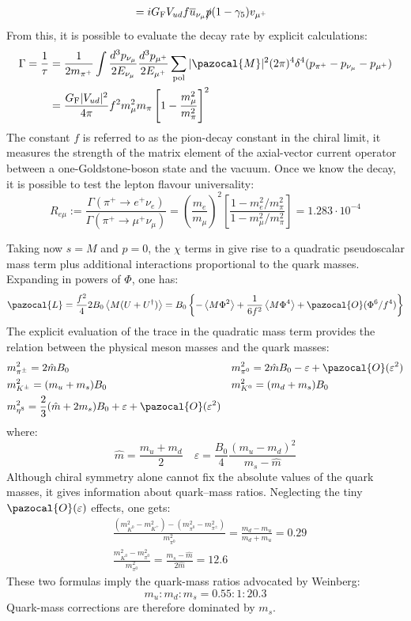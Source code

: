 \documentclass[../main.tex]{subfiles}
\begin{document}
\begin{kaobox}[frametitle=Charged Pion Decay]
\begin{align*}
&=iG_{\text{F}}V_{ud}f\overline{u}_{\nu_\mu}\slashed{p}(1-\gamma_5)v_{\mu^+}
\end{align*}
From this, it is possible to evaluate the decay rate by explicit calculations:
\begin{align*}
\Gamma=\frac{1}{\tau}&=\frac{1}{2m_{\pi^+}}\int\frac{d^3p_{\nu_\mu}}{2E_{\nu_\mu}}\frac{d^3p_{\mu^+}}{2E_{\mu^+}}\sum_{\text{pol}}|\pazocal{M}|^2(2\pi)^4\delta^4(p_{\pi^+}-p_{\nu_\mu}-p_{\mu^+})\\
&=\frac{G_{\text{F}}|V_{ud}|^2}{4\pi}f^2m_\mu^2m_\pi\left[1-\frac{m_\mu^2}{m_\pi^2}\right]^2
\end{align*}
The constant $f$ is referred to as the pion-decay constant in the chiral limit, it measures the strength of the matrix element of the axial-vector current
operator between a one-Goldstone-boson state and the vacuum. Once we know the decay, it is possible to test the lepton flavour universality:
\[
R_{e\mu}:=\frac{\Gamma(\pi^+\to e^+\nu_e)}{\Gamma(\pi^+\to\mu^+\nu_\mu)}=\left(\frac{m_e}{m_\mu}\right)^2\left[\frac{1-m_e^2/m_\pi^2}{1-m_\mu^2/m_\pi^2}\right]=1.283\cdot10^{-4}
\]
\end{kaobox}
Taking now $s=M$ and $p=0$, the $\chi$ terms in  give rise to a
quadratic pseudoscalar mass term plus additional interactions proportional to the quark masses. Expanding in powers of $\Phi$, one has:
\[
\pazocal{L}=\frac{f^2}{4}2B_0\Braket{M(U+U^\dagger)}=B_0\left\{-\Braket{M\Phi^2}+\frac{1}{6f^2}\Braket{M\Phi^4}+\pazocal{O}(\Phi^6/f^4)\right\}
\]
The explicit evaluation of the trace in the quadratic mass term provides the relation between the physical meson masses and the quark masses:
\[
\begin{aligned}
&m_{\pi^\pm}^2=2\hat{m}B_0 &&m_{\pi^0}^2=2\hat{m}B_0-\varepsilon+\pazocal{O}(\varepsilon^2)\\
&m_{K^\pm}^2=(m_u+m_s)B_0 &&m_{K^0}^2=(m_d+m_s)B_0\\
&m_{\eta^8}^2=\frac{2}{3}(\hat{m}+2m_s)B_0+\varepsilon+\pazocal{O}(\varepsilon^2)
\end{aligned}
\]
where:
\[
\hat{m}=\frac{m_u+m_d}{2} \quad \varepsilon=\frac{B_0}{4}\frac{(m_u-m_d)^2}{m_s-\hat{m}}
\]
Although chiral symmetry alone cannot fix the absolute values of the
quark masses, it gives information about quark–mass ratios. Neglecting
the tiny $\pazocal{O}(\varepsilon)$ effects, one gets:
\[
\begin{aligned}
&\frac{(m_{K^0}^2-m_{K^+}^2)-(m_{\pi^0}^2-m_{\pi^\pm}^2)}{m_{\pi^0}^2}=\frac{m_d-m_u}{m_d+m_u}=0.29\\
&\frac{m_{K^0}^2-m_{\pi^0}^2}{m_{\pi^0}^2}=\frac{m_s-\hat{m}}{2\hat{m}}=12.6
\end{aligned}
\]
These two formulas imply the quark-mass ratios advocated by Weinberg:
\[
m_u:m_d:m_s=0.55:1:20.3
\]
Quark-mass corrections are therefore dominated by $m_s$.
\end{document}
